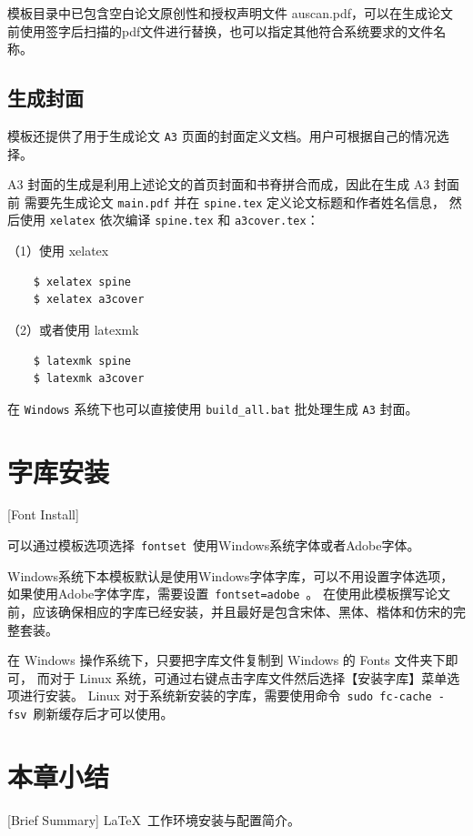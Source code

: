 模板目录中已包含空白论文原创性和授权声明文件 auscan.pdf，可以在生成论文前使用签字后扫描的pdf文件进行替换，也可以指定其他符合系统要求的文件名称。

\subsection{生成封面}
\label{sec:generate-cover}

模板还提供了用于生成论文 \texttt{A3} 页面的封面定义文档。用户可根据自己的情况选择。

A3 封面的生成是利用上述论文的首页封面和书脊拼合而成，因此在生成 A3 封面前
需要先生成论文 \texttt{main.pdf} 并在 \texttt{spine.tex} 定义论文标题和作者姓名信息，
然后使用 \texttt{xelatex} 依次编译 \texttt{spine.tex} 和 \texttt{a3cover.tex}：

（1）使用 xelatex

\begin{lstlisting}
    $ xelatex spine
    $ xelatex a3cover
\end{lstlisting}

（2）或者使用 latexmk

\begin{lstlisting}
    $ latexmk spine
    $ latexmk a3cover
\end{lstlisting}

在 \texttt{Windows} 系统下也可以直接使用 \texttt{build\_all.bat} 批处理生成 \texttt{A3} 封面。

\section{字库安装}[Font Install]

可以通过模板选项选择~\texttt{fontset}~使用Windows系统字体或者Adobe字体。

Windows系统下本模板默认是使用Windows字体字库，可以不用设置字体选项，如果使用Adobe字体字库，需要设置~\texttt{fontset=adobe}~。
在使用此模板撰写论文前，应该确保相应的字库已经安装，并且最好是包含宋体、黑体、楷体和仿宋的完整套装。

在 Windows 操作系统下，只要把字库文件复制到 Windows 的 Fonts 文件夹下即可，
而对于 Linux 系统，可通过右键点击字库文件然后选择【安装字库】菜单选项进行安装。
Linux 对于系统新安装的字库，需要使用命令~\texttt{sudo fc-cache -fsv}~刷新缓存后才可以使用。

\section*{本章小结}[Brief Summary]
\LaTeX{}~工作环境安装与配置简介。
